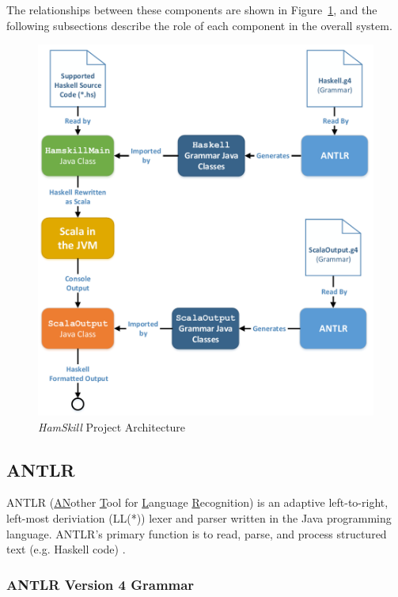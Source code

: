 \documentclass{report}
\begin{document}
The relationships between these components are shown in Figure~\ref{fig:hamskillArchitecture}, and the following subsections describe the role of each component in the overall system.

\begin{figure}[ht!]
	\centering
		\includegraphics[width=1.0\textwidth]{images/cs252_project_diagram_cropped.pdf}
	\caption{\textit{HamSkill} Project Architecture}\label{fig:hamskillArchitecture}
\end{figure}

\subsection{ANTLR}

ANTLR (\underline{AN}other \underline{T}ool for \underline{L}anguage \underline{R}ecognition) is an adaptive left-to-right, left-most deriviation (LL(*)) lexer and parser written in the Java programming language.  ANTLR's primary function is to read, parse, and process structured text (e.g. Haskell code) \cite{antlrDefinitiveReference}.  

\subsubsection{ANTLR Version 4 Grammar}
\end{document}
